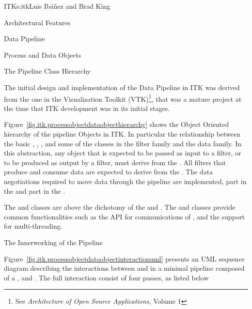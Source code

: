 \begin{aosachapter}{ITK}{s:itk}{Luis Ib\'{a}\~{n}ez and Brad King}
\begin{aosasect1}{Architectural Features}
\begin{aosasect2}{Data Pipeline}
\begin{aosasect3}{Process and Data Objects}
\end{aosasect3}

\begin{aosasect3}{The Pipeline Class Hierarchy}

The initial design and implementation of the Data Pipeline in ITK was derived
from the one in the Visualization Toolkit (VTK)\footnote{See \emph{Architecture
of Open Source Applications}, Volume 1}, that was a mature project at the time
that ITK development was in its initial stages.

Figure~\ref{fig.itk.processobjectdataobjecthierarchy} shows the Object Oriented
hierarchy of the pipeline Objects in ITK. In particular the relationship
between the basic , , , and
some of the classes in the filter family and the data family. In this
abstraction, any object that is expected to be passed as input to a filter, or
to be produced as output by a filter, must derive from the . All
filters that produce and consume data are expected to derive from the
. The data negotiations required to move data through the
pipeline are implemented, part in the  and part in the
.


The  and  classes are above the
dichotomy of the  and . The
 and  classes provide common
functionalities such as the API for communications of ,
and the support for multi-threading.

\end{aosasect3}


\begin{aosasect3}{The Innerworking of the Pipeline}


Figure~\ref{fig.itk.processobjectdataobjectinteractionuml} presents an UML
sequence diagram describing the interactions between  and
 in a minimal pipeline composed of a ,
 and . The full interaction
consist of four passes, as listed below


\end{aosasect3}
\end{aosasect2}
\end{aosasect1}
\end{aosachapter}
